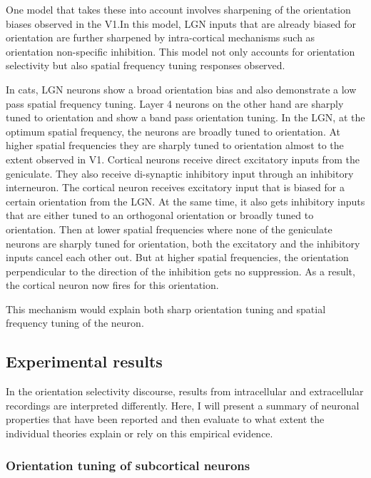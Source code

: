 				One model that takes these into account involves sharpening of the orientation biases observed in the V1.In this model, LGN inputs that are already biased for orientation are further sharpened by intra-cortical mechanisms such as orientation non-specific inhibition. This model not only accounts for orientation selectivity but also spatial frequency tuning responses observed.
	
	In cats, LGN neurons show a broad orientation bias and also demonstrate a low pass spatial frequency tuning. Layer 4 neurons on the other hand are sharply tuned to orientation and show a band pass orientation tuning.
	In the LGN, at the optimum spatial frequency, the neurons are broadly tuned to orientation. At higher spatial frequencies they are sharply tuned to orientation almost to the extent observed in V1.
	Cortical neurons receive direct excitatory inputs from the geniculate. They also receive di-synaptic inhibitory input through an inhibitory interneuron. 
	The cortical neuron receives excitatory input that is biased for a certain orientation from the LGN. At the same time, it also gets inhibitory inputs that are either tuned to an orthogonal orientation or broadly tuned to orientation. Then at lower spatial frequencies where none of the geniculate neurons are sharply tuned for orientation, both the excitatory and the inhibitory inputs cancel each other out. But at higher spatial frequencies, the orientation perpendicular to the direction of the inhibition gets no suppression. As a result, the cortical neuron now fires for this orientation.
	
	This mechanism would explain both sharp orientation tuning and spatial frequency tuning of the neuron.
	
	\subsection{Experimental results}
	
	In the orientation selectivity discourse, results from intracellular and extracellular recordings are interpreted differently. Here, I will present a summary of neuronal properties that have been reported and then evaluate to what extent the individual theories explain or rely on this empirical evidence.
	
	\subsubsection{Orientation tuning of subcortical neurons}
	
